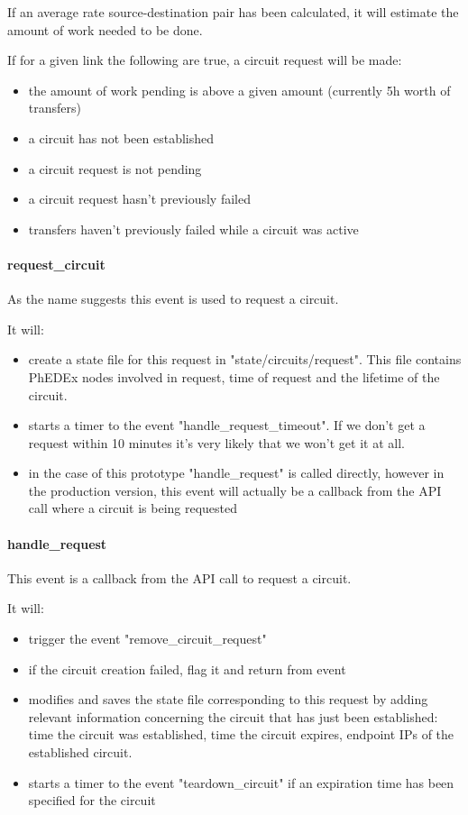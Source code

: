 If an average rate source-destination pair has been calculated, it will estimate
the amount of work needed to be done.

If for a given link the following are true, a circuit request will be made:
\begin{itemize}
  \item the amount of work pending is above a given amount (currently 5h worth of transfers) 
  \item a circuit has not been established
  \item a circuit request is not pending
  \item a circuit request hasn't previously failed
  \item transfers haven't previously failed while a circuit was active
\end{itemize}

\paragraph{request\_circuit}

As the name suggests this event is used to request a circuit.

It will:
\begin{itemize}
  \item create a state file for this request in "state/circuits/request". 
This file contains PhEDEx nodes involved in request, time of request and the 
lifetime of the circuit.
  \item starts a timer to the event "handle\_request\_timeout". If we don't
get a request within 10 minutes it's very likely that we won't get it at 
all.
  \item in the case of this prototype "handle\_request" is called directly,
however in the production version, this event will actually be a callback
from the API call where a circuit is being requested
\end{itemize}

\paragraph{handle\_request}

This event is a callback from the API call to request a circuit.

It will:
\begin{itemize}
  \item trigger the event "remove\_circuit\_request"
  \item if the circuit creation failed, flag it and return from event
  \item modifies and saves the state file corresponding to this request by 
adding relevant information concerning the circuit that has just been established:
time the circuit was established, time the circuit expires, endpoint IPs of 
the established circuit.
  \item starts a timer to the event "teardown\_circuit" if an expiration
time has been specified for the circuit
\end{itemize}


